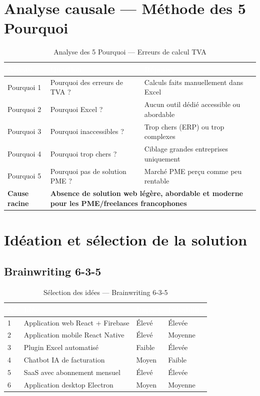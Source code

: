 \section{Analyse causale — Méthode des 5 Pourquoi}

\begin{table}[H]
\centering
\caption{Analyse des 5 Pourquoi — Erreurs de calcul TVA}
\label{tab:5pourquoi}
\begin{tabularx}{\textwidth}{|l|X|X|}
\hline
\rowcolor{emsiblue}\textcolor{white}{\textbf{Niveau}} & \textcolor{white}{\textbf{Question}} & \textcolor{white}{\textbf{Réponse}} \\
\hline
Pourquoi 1 & Pourquoi des erreurs de TVA ? & Calculs faits manuellement dans Excel \\
Pourquoi 2 & Pourquoi Excel ? & Aucun outil dédié accessible ou abordable \\
Pourquoi 3 & Pourquoi inaccessibles ? & Trop chers (ERP) ou trop complexes \\
Pourquoi 4 & Pourquoi trop chers ? & Ciblage grandes entreprises uniquement \\
Pourquoi 5 & Pourquoi pas de solution PME ? & Marché PME perçu comme peu rentable \\
\hline
\rowcolor{lightblue}\textbf{Cause racine} & \multicolumn{2}{X|}{\textbf{Absence de solution web légère, abordable et moderne pour les PME/freelances francophones}} \\
\hline
\end{tabularx}
\end{table}

\section{Idéation et sélection de la solution}

\subsection{Brainwriting 6-3-5}

\begin{table}[H]
\centering
\caption{Sélection des idées — Brainwriting 6-3-5}
\label{tab:brainwriting}
\begin{tabularx}{\textwidth}{|l|X|l|l|}
\hline
\rowcolor{emsiblue}\textcolor{white}{\textbf{N°}} & \textcolor{white}{\textbf{Idée}} & \textcolor{white}{\textbf{Impact}} & \textcolor{white}{\textbf{Faisabilité}} \\
\hline
1 & Application web React + Firebase & Élevé & Élevée \\
2 & Application mobile React Native & Élevé & Moyenne \\
3 & Plugin Excel automatisé & Faible & Élevée \\
4 & Chatbot IA de facturation & Moyen & Faible \\
5 & SaaS avec abonnement mensuel & Élevé & Élevée \\
6 & Application desktop Electron & Moyen & Moyenne \\
\hline
\end{tabularx}
\end{table}

